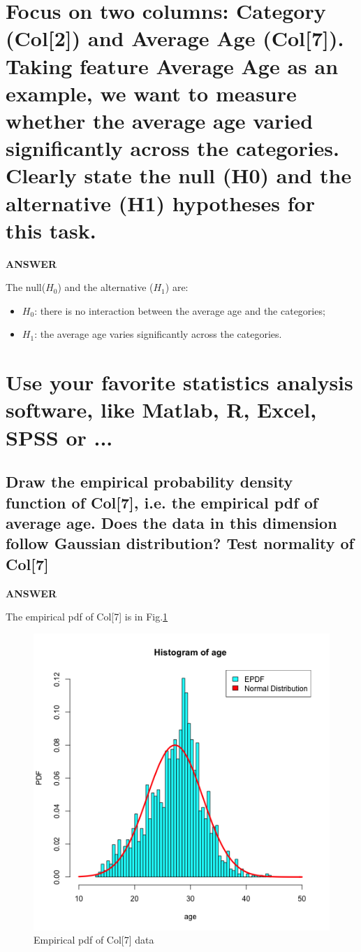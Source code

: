 \documentclass[a4paper]{article}
\begin{document}
\section{Focus on two columns: Category (Col[2]) and Average Age (Col[7]). Taking feature Average Age as an example, we want to measure whether the average age varied significantly across the categories. Clearly state the null (H0) and the alternative (H1) hypotheses for this task.}


\textbf{ANSWER}

The null($H_0$) and the alternative ($H_1$) are:
\begin{itemize}
	\item $H_0$: there is no interaction between the average age and the categories;
	\item $H_1$: the average age varies significantly across the categories.
\end{itemize}

\section{Use your favorite statistics analysis software, like Matlab, R, Excel, SPSS or ...}


\subsection{Draw the empirical probability density function of Col[7], i.e. the empirical pdf of average age. Does the data in this dimension follow Gaussian distribution? Test normality of Col[7]}
\label{subsec:3a}
\textbf{ANSWER}

The empirical pdf of Col[7] is in Fig.\ref{3a} 
\begin{figure}[h]
	\centering
	\includegraphics[width=0.7\linewidth]{images/3a.png}
	\caption{\label{3a}Empirical pdf of Col[7] data}
\end{figure}
\end{document}
